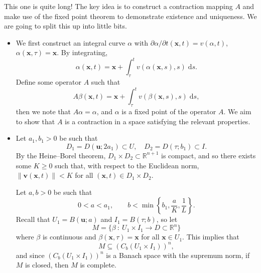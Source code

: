 \documentclass[letter-paper]{tufte-book}
\newenvironment{proof}[1][Proof]{\begin{trivlist}
\item[\hskip \labelsep {\bfseries #1}]}{\end{trivlist}}
\begin{document}
\begin{proof}
  This one is quite long! The key idea is to construct a contraction mapping $A$
  and make use of the fixed point theorem to demonstrate existence and
  uniqueness. We are going to split this up into little bits.
  
  \begin{itemize}
    \item We first construct an integral curve $\alpha$ with
    $\partial\alpha/\partial t (\boldsymbol{x}, t) = v(\alpha, t)$,
    $\alpha(\boldsymbol{x}, \tau) = \boldsymbol{x}$. By integrating,
    \begin{equation*}
      \alpha(\boldsymbol{x}, t) = \boldsymbol{x} + \int_\tau^t v(\alpha(\boldsymbol{x}, s), s)\; \mathrm{d}s.
    \end{equation*}
    Define some operator $A$ such that
    \begin{equation*}
      A\beta(\boldsymbol{x}, t) = \boldsymbol{x} + \int_\tau^t v(\beta(\boldsymbol{x}, s), s)\; \mathrm{d}s,
    \end{equation*}
    then we note that $A\alpha =\alpha$, and $\alpha$ is a fixed point of the
    operator $A$. We aim to show that $A$ is a contraction in a space satisfying
    the relevant properties.
    
    \item Let $a_1, b_1 > 0$ be such that
    \begin{equation*}
      D_1 = D(\boldsymbol{u}; 2a_1) \subset U, \quad D_2 = D(\tau; b_1) \subset I.
    \end{equation*}
    By the Heine--Borel theorem, $D_1 \times D_2 \subset
    \mathbb{R}^{n+1}$ is compact, and so there exists some $K \geq 0$ such that,
    with respect to the Euclidean norm, $\|\boldsymbol{v}(\boldsymbol{x}, t)\| <
    K$ for all $(\boldsymbol{x}, t) \in D_1 \times D_2$.
    
    Let $a, b > 0$ be such that
    \begin{equation*}
      0 < a < a_1, \qquad b < \min \left\{b_1, \frac{a}{K}, \frac{1}{L}\right\}.
    \end{equation*}
    Recall that $U_1 = B(\boldsymbol{u}; a)$ and $I_1 = B(\tau; b)$, so let
    \begin{equation*}
      M = \{\beta\ :\ U_1 \times I_1 \to D \subset \mathbb{R}^n \}
    \end{equation*}
    where $\beta$ is continuous and $\beta(\boldsymbol{x}, \tau) =
    \boldsymbol{x}$ for all $\boldsymbol{x}\in U_1$. This implies that
    \begin{equation*}
      M \subseteq \left( C_b(U_1 \times I_1) \right)^n,
    \end{equation*}
    and since $\left( C_b(U_1 \times I_1) \right)^n$ is a Banach space with the
    supremum norm, if $M$ is closed, then $M$ is complete.
    

\end{itemize}
\end{proof}
\end{document}
